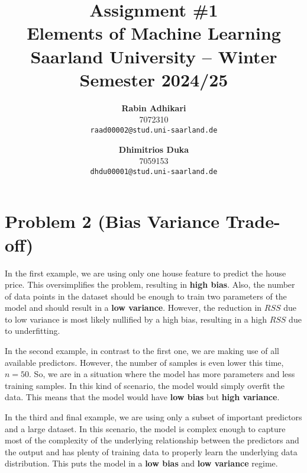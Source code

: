 \documentclass{article}
\title{Assignment \#1\\
  \vspace{2mm}
  \small{Elements of Machine Learning}
  \\
  \vspace{2mm}
  \small{Saarland University -- Winter Semester 2024/25}
}
\author{%
\textbf{Rabin Adhikari} \\
  7072310 \\
  \texttt{raad00002@stud.uni-saarland.de} \\
  \and
  \textbf{Dhimitrios Duka} \\
 7059153 \\
  \texttt{dhdu00001@stud.uni-saarland.de} \\
}
\begin{document}
\maketitle

\section*{Problem 2 (Bias Variance Trade-off)}
In the first example, we are using only one house feature to predict the house price. This oversimplifies the problem, resulting in \textbf{high bias}.
Also, the number of data points in the dataset should be enough to train two parameters of the model and should result in a \textbf{low variance}.
However, the reduction in $RSS$ due to low variance is most likely nullified by a high bias, resulting in a high $RSS$ due to underfitting.

In the second example, in contrast to the first one, we are making use of all available predictors. However, the number of samples is even lower this time, $n=50$. So, we are in a situation where the model has more parameters and less training samples. In this kind of scenario, the model would simply overfit the data. This means that the model would have \textbf{low bias} but \textbf{high variance}.

In the third and final example, we are using only a subset of important predictors and a large dataset. In this scenario, the model is complex enough to capture most of the complexity of the underlying relationship between the predictors and the output and has plenty of training data to properly learn the underlying data distribution. This puts the model in a \textbf{low bias} and \textbf{low variance} regime.

\clearpage

% 
% 

\end{document}
